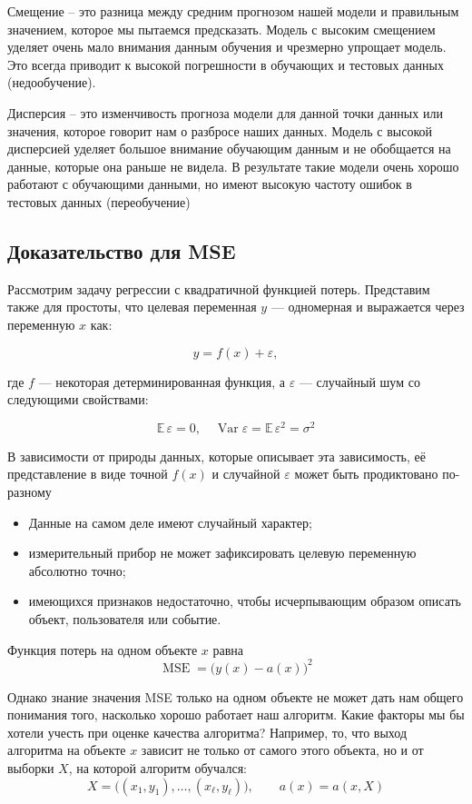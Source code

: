Смещение -- это разница между средним прогнозом нашей модели и правильным значением, которое мы пытаемся предсказать.
Модель с высоким смещением уделяет очень мало внимания данным обучения и чрезмерно упрощает модель.
Это всегда приводит к высокой погрешности в обучающих и тестовых данных (недообучение).

Дисперсия -- это изменчивость прогноза модели для данной точки данных или значения, которое говорит нам о разбросе
наших данных.
Модель с высокой дисперсией уделяет большое внимание обучающим данным и не обобщается на данные, которые она раньше
не видела.
В результате такие модели очень хорошо работают с обучающими данными, но имеют высокую частоту ошибок в тестовых
данных (переобучение)

\subsection{Доказательство для MSE}

Рассмотрим задачу регрессии с квадратичной функцией потерь.
Представим также для простоты, что целевая переменная $y$ --- одномерная и выражается через переменную $x$ как:

\[ y = f(x) + \varepsilon, \]

где $f$ --- некоторая детерминированная функция, а $\varepsilon$ --- случайный шум со следующими свойствами:

\[ \mathbb{E}\,\varepsilon = 0, \quad \operatorname{Var}\varepsilon = \mathbb{E}\,\varepsilon^{2} = \sigma^{2} \]

В зависимости от природы данных, которые описывает эта зависимость, её представление в виде точной $f(x)$ и
случайной $\varepsilon$ может быть продиктовано по-разному

\begin{itemize}
    \item Данные на самом деле имеют случайный характер;
    \item измерительный прибор не может зафиксировать целевую переменную абсолютно точно;
    \item имеющихся признаков недостаточно, чтобы исчерпывающим образом описать объект, пользователя или событие.
\end{itemize}

Функция потерь на одном объекте $x$ равна
\[ \operatorname{MSE} = \bigl(y(x) - a(x)\bigr)^{2} \]

Однако знание значения MSE только на одном объекте не может дать нам общего понимания того, насколько хорошо
работает наш алгоритм.
Какие факторы мы бы хотели учесть при оценке качества алгоритма?
Например, то, что выход алгоритма на объекте $x$ зависит не только от самого этого объекта, но и от выборки $X$, на
которой алгоритм обучался:
\[ X = \bigl((x_{1},y_{1}), \dots, (x_{\ell}, y_{\ell})\bigr), \qquad a(x) = a(x, X) \]

